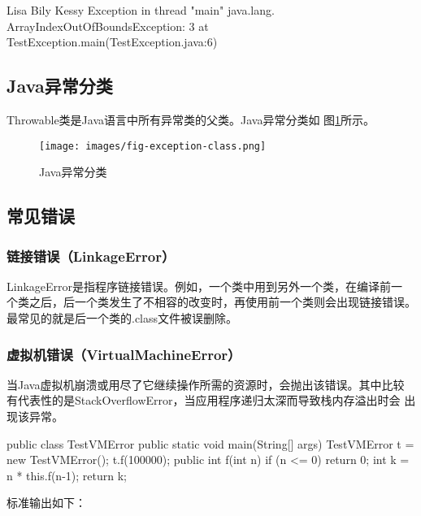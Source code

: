 \begin{stdoutCode}
Lisa
Bily
Kessy
Exception in thread "main" java.lang.
ArrayIndexOutOfBoundsException: 3
at TestException.main(TestException.java:6)
\end{stdoutCode}

\subsection{Java异常分类}
 
Throwable类是Java语言中所有异常类的父类。Java异常分类如
图\ref{fig:exception-class}所示。

\begin{figure}[h]
\centering
\texttt{[image: images/fig-exception-class.png]}
\caption{Java异常分类}
\label{fig:exception-class}
\end{figure}

\subsection{常见错误}

\subsubsection{链接错误（LinkageError）}

LinkageError是指程序链接错误。例如，一个类中用到另外一个类，在编译前一
个类之后，后一个类发生了不相容的改变时，再使用前一个类则会出现链接错误。
最常见的就是后一个类的.class文件被误删除。

\subsubsection{虚拟机错误（VirtualMachineError）}
 
当Java虚拟机崩溃或用尽了它继续操作所需的资源时，会抛出该错误。其中比较
有代表性的是StackOverflowError，当应用程序递归太深而导致栈内存溢出时会
出现该异常。


\begin{javaCode}
  public class TestVMError {
    public static void main(String[] args) {
      TestVMError t = new TestVMError();
      t.f(100000);
    }
    public int f(int n) {
      if (n <= 0) {
        return 0;
      }
      int k = n * this.f(n-1);
      return k;
    }
  }
\end{javaCode}

标准输出如下：

